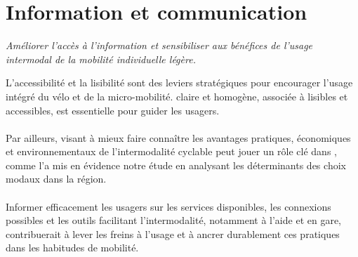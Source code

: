 \documentclass[../main.tex]{subfiles}
\begin{document}
    \newpage

    \vspace{15pt}
\section{Information et communication}

\begin{block}[Sensibiliser]
    \linespread{0.9}\selectfont %
    \textit{\small{Améliorer l'accès à l'information et sensibiliser aux bénéfices de l'usage intermodal de la mobilité individuelle légère.}}
\end{block}

    \begin{multicols}{2}
    \raggedcolumns
    \small{
L’accessibilité et la lisibilité  sont des leviers stratégiques pour encourager l’usage intégré du vélo et de la micro-mobilité.  claire et homogène, associée à  lisibles et accessibles, est essentielle pour guider les usagers.
    \\\\
Par ailleurs,  visant à mieux faire connaître les avantages pratiques, économiques et environnementaux de l’intermodalité cyclable peut jouer un rôle clé dans , comme l’a mis en évidence notre étude en analysant les déterminants des choix modaux dans la région.
    \\\\
Informer efficacement les usagers sur les services disponibles, les connexions possibles et les outils facilitant l'intermodalité, notamment à l'aide  et  en gare, contribuerait à lever les freins à l’usage et à ancrer durablement ces pratiques dans les habitudes de mobilité.
    }
    \end{multicols}
\end{document}
